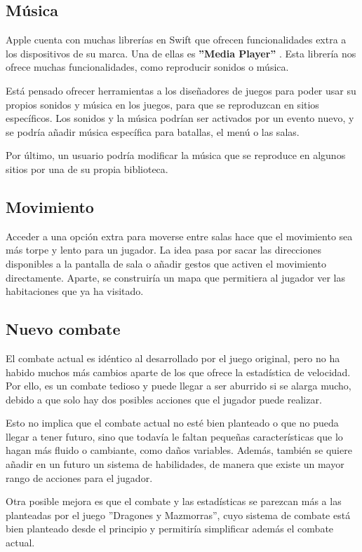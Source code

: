 \subsection{Música}
Apple cuenta con muchas librerías en Swift que ofrecen funcionalidades extra a los dispositivos de su marca. Una de ellas es \textbf{''Media Player''} \cite{mediaPlayer}.
Esta librería nos ofrece muchas funcionalidades, como reproducir sonidos o música.

Está pensado ofrecer herramientas a los diseñadores de juegos para poder usar su propios sonidos y música en los juegos, para que se reproduzcan en sitios específicos. Los sonidos y la música podrían ser activados por un evento nuevo, y se podría añadir música específica para batallas, el menú o las salas.

Por último, un usuario podría modificar la música que se reproduce en algunos sitios por una de su propia biblioteca.

\subsection{Movimiento}
Acceder a una opción extra para moverse entre salas hace que el movimiento sea más torpe y lento para un jugador. La idea pasa por sacar las direcciones disponibles a la pantalla de sala o añadir gestos que activen el movimiento directamente. Aparte, se construiría un mapa que permitiera al jugador ver las habitaciones que ya ha visitado.

\subsection{Nuevo combate}
El combate actual es idéntico al desarrollado por el juego original, pero no ha habido muchos más cambios aparte de los que ofrece la estadística de velocidad. Por ello, es un combate tedioso y puede llegar a ser aburrido si se alarga mucho, debido a que solo hay dos posibles acciones que el jugador puede realizar.

Esto no implica que el combate actual no esté bien planteado o que no pueda llegar a tener futuro, sino que todavía le faltan pequeñas características que lo hagan más fluido o cambiante, como daños variables.
Además, también se quiere añadir en un futuro un sistema de habilidades, de manera que existe un mayor rango de acciones para el jugador.

Otra posible mejora es que el combate y las estadísticas se parezcan más a las planteadas por el juego ''Dragones y Mazmorras'', cuyo sistema de combate está bien planteado desde el principio y permitiría simplificar además el combate actual.

